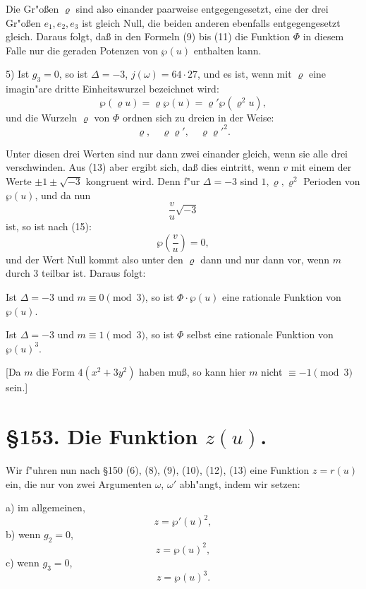 \documentclass[12pt,a4paper]{article}
\begin{document}
Die Gr"o\ss{}en $\varrho$ sind also einander paarweise entgegengesetzt, eine der drei Gr"o\ss{}en $e_1, e_2, e_3$ ist gleich Null, die beiden anderen ebenfalls entgegengesetzt gleich. Daraus folgt, da\ss{} in den Formeln (9) bis (11) die Funktion $\Phi$ in diesem Falle nur die geraden Potenzen von $\wp(u)$ enthalten kann.

5) Ist $g_3 = 0$, so ist $\Delta = -3$, $j(\omega) = 64 \cdot 27$, und es ist, wenn mit $\varrho$ eine imagin"are dritte Einheitswurzel bezeichnet wird:
\begin{equation}\wp(\varrho u) = \varrho\wp(u) = \varrho'\wp(\varrho^2 u),\end{equation}
und die Wurzeln $\varrho$ von $\Phi$ ordnen sich zu dreien in der Weise:
\begin{equation}\varrho, \quad \varrho\varrho', \quad \varrho\varrho'^2.\end{equation}

Unter diesen drei Werten sind nur dann zwei einander gleich, wenn sie alle drei verschwinden. Aus (13) aber ergibt sich, da\ss{} dies eintritt, wenn $v$ mit einem der Werte $\pm 1 \pm \sqrt{-3}$ kongruent wird. Denn f"ur $\Delta = -3$ sind $1, \varrho, \varrho^2$ Perioden von $\wp(u)$, und da nun
\[\frac{v}{u}\sqrt{-3}\]
ist, so ist nach (15):
\[\wp\left(\frac{v}{u}\right) = 0,\]
und der Wert Null kommt also unter den $\varrho$ dann und nur dann vor, wenn $m$ durch 3 teilbar ist. Daraus folgt:

Ist $\Delta = -3$ und $m \equiv 0 \pmod{3}$, so ist $\Phi\cdot\wp(u)$ eine rationale Funktion von $\wp(u)$.

Ist $\Delta = -3$ und $m \equiv 1 \pmod{3}$, so ist $\Phi$ selbst eine rationale Funktion von $\wp(u)^3$.

[Da $m$ die Form $4(x^2 + 3y^2)$ haben mu\ss{}, so kann hier $m$ nicht $\equiv -1 \pmod{3}$ sein.]

\section*{\S 153. Die Funktion $z(u)$.}

Wir f"uhren nun nach \S 150 (6), (8), (9), (10), (12), (13) eine Funktion $z = r(u)$ ein, die nur von zwei Argumenten $\omega$, $\omega'$ abh"angt, indem wir setzen:

a) im allgemeinen,
\begin{equation}z = \wp'(u)^2,\end{equation}
b) wenn $g_2 = 0$,
\[z = \wp(u)^2,\]
c) wenn $g_3 = 0$,
\[z = \wp(u)^3.\]
\end{document}
